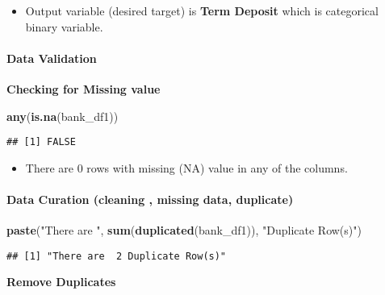 \documentclass[
]{article}
\newenvironment{Shaded}{\begin{snugshade}}{\end{snugshade}}
\newcommand{\KeywordTok}[1]{\textcolor[rgb]{0.13,0.29,0.53}{\textbf{#1}}}
\newcommand{\NormalTok}[1]{#1}
\newcommand{\OperatorTok}[1]{\textcolor[rgb]{0.81,0.36,0.00}{\textbf{#1}}}
\newcommand{\StringTok}[1]{\textcolor[rgb]{0.31,0.60,0.02}{#1}}
\providecommand{\tightlist}{%
  \setlength{\itemsep}{0pt}\setlength{\parskip}{0pt}}
\begin{document}
\begin{itemize}
\tightlist
\item
  Output variable (desired target) is \textbf{Term Deposit} which is
  categorical binary variable.
\end{itemize}

\hypertarget{data-validation}{%
\paragraph{Data Validation}\label{data-validation}}

\textbf{Checking for Missing value}

\begin{Shaded}
\begin{Highlighting}[]
\KeywordTok{any}\NormalTok{(}\KeywordTok{is.na}\NormalTok{(bank_df1))}
\end{Highlighting}
\end{Shaded}

\begin{verbatim}
## [1] FALSE
\end{verbatim}

\begin{itemize}
\tightlist
\item
  There are 0 rows with missing (NA) value in any of the columns.
\end{itemize}

\hypertarget{data-curation-cleaning-missing-data-duplicate}{%
\paragraph{Data Curation (cleaning , missing data,
duplicate)}\label{data-curation-cleaning-missing-data-duplicate}}

\begin{Shaded}
\begin{Highlighting}[]
\KeywordTok{paste}\NormalTok{(}\StringTok{"There are "}\NormalTok{, }\KeywordTok{sum}\NormalTok{(}\KeywordTok{duplicated}\NormalTok{(bank_df1)), }\StringTok{"Duplicate Row(s)"}\NormalTok{)}
\end{Highlighting}
\end{Shaded}

\begin{verbatim}
## [1] "There are  2 Duplicate Row(s)"
\end{verbatim}

\textbf{Remove Duplicates}

\begin{Shaded}
\end{Shaded}
\end{document}
